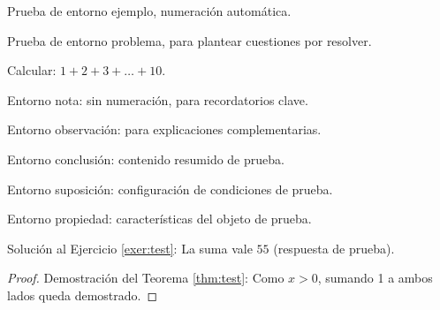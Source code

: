 \documentclass[es]{../../elegantbook}
\begin{document}
\begin{definition}
\begin{theorem}
\begin{lemma}
\begin{corollary}
\begin{axiom}
\begin{postulate}
\begin{proposition}
\begin{example}\label{exa:test}
Prueba de entorno ejemplo, numeración automática.
\end{example}

\begin{problem}\label{probl:test}
Prueba de entorno problema, para plantear cuestiones por resolver.
\end{problem}

\begin{exercise}\label{exer:test}
Calcular: $1+2+3+\dots+10$.
\end{exercise}

\begin{note}
Entorno nota: sin numeración, para recordatorios clave.
\end{note}

\begin{remark}
Entorno observación: para explicaciones complementarias.
\end{remark}

\begin{conclusion}
Entorno conclusión: contenido resumido de prueba.
\end{conclusion}

\begin{assumption}
Entorno suposición: configuración de condiciones de prueba.
\end{assumption}

\begin{property}
Entorno propiedad: características del objeto de prueba.
\end{property}

\begin{solution}
Solución al Ejercicio \ref{exer:test}: La suma vale $55$ (respuesta de prueba).
\end{solution}

\begin{proof}
Demostración del Teorema \ref{thm:test}: Como $x>0$, sumando 1 a ambos lados queda demostrado.
\end{proof}


\end{proposition}
\end{postulate}
\end{axiom}
\end{corollary}
\end{lemma}
\end{theorem}
\end{definition}
\end{document}
